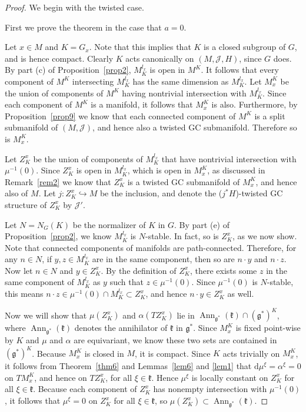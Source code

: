 \documentclass[11pt]{article}
\numberwithin{equation}{section}
\newcommand{\hookfunc}[3]{#1 \colon #2 \hookrightarrow #3}
\newcommand{\tang}{T}
\begin{document}
\begin{proof}
We begin with the twisted case.

First we prove the theorem in the case that $a=0$.

Let $x \in M$ and $K = G_x$.
Note that this implies that $K$ is a closed subgroup of $G$, and is hence compact.
Clearly $K$ acts canonically on $(M,\mathcal{J},H)$, since $G$ does.
By part (c) of Proposition~\ref{prop2}, $M_K^{l_x}$ is open in $M^K$.
It follows that every component of $M^K$ intersecting $M_K^{l_x}$ has the same dimension as $M_K^{l_x}$.
Let $M_x^K$ be the union of components of $M^K$ having nontrivial intersection with $M_K^{l_x}$.
Since each component of $M^K$ is a manifold, it follows that $M_x^K$ is also.
Furthermore, by Proposition~\ref{prop9} we know that each connected component of $M^K$ is a split submanifold of $(M,\mathcal{J})$, and hence also a twisted GC submanifold.
Therefore so is $M_x^K$.

Let $Z_K^x$ be the union of components of $M_K^{l_x}$ that have nontrivial intersection with $\mu^{-1}(0)$.
Since $Z_K^x$ is open in $M_K^{l_x}$, which is open in $M_x^K$, as discussed in Remark~\ref{rem2} we know that $Z_K^x$ is a twisted GC submanifold of $M_x^K$, and hence also of $M$.
Let $\hookfunc{j}{Z_K^x}{M}$ be the inclusion, and denote the ($j^*H$)-twisted GC structure of $Z_K^x$ by $\mathcal{J}'$.

Let $N=N_G(K)$ be the normalizer of $K$ in $G$.  By part (e) of Proposition~\ref{prop2}, we know $M_K^{l_x}$ is $N$-stable.  In fact, so is $Z_K^x$, as we now show.  Note that connected components of manifolds are path-connected.  Therefore, for any $n \in N$, if $y,z \in M_K^{l_x}$ are in the same component, then so are $n \cdot y$ and $n \cdot z$.
Now let $n \in N$ and $y \in Z_K^x$.
By the def\/inition of $Z_K^x$, there exists some $z$ in the same component of $M_K^{l_x}$ as $y$ such that $z \in \mu^{-1}(0)$.
Since $\mu^{-1}(0)$ is $N$-stable, this means $n \cdot z \in \mu^{-1}(0) \cap M_K^{l_x} \subset Z_K^x$, and hence $n \cdot y \in Z_K^x$ as well.

Now we will show that $\mu(Z_K^x)$ and $\alpha( \tang Z_K^x)$ lie in $\operatorname{Ann}_{\mathfrak{g}^*} (\mathfrak{k}) \cap (\mathfrak{g}^*)^K$, where $\operatorname{Ann}_{\mathfrak{g}^*} (\mathfrak{k})$ denotes the annihilator of $\mathfrak{k}$ in $\mathfrak{g}^*$.
Since $M_x^K$ is f\/ixed point-wise by $K$ and $\mu$ and $\alpha$ are equivariant, we know these two sets are contained in $(\mathfrak{g}^*)^K$.
Because $M_x^K$ is closed in $M$, it is compact.  Since $K$ acts trivially on $M_x^K$, it follows from Theorem~\ref{thm6} and Lemmas~\ref{lem6} and \ref{lem1} that $\mathrm{d} \mu^{\xi} = \alpha^{\xi} = 0$ on $\tang M_x^K$, and hence on $\tang Z_K^x$, for all $\xi \in \mathfrak{k}$.
Hence $\mu^{\xi}$ is locally constant on $Z_K^x$ for all $\xi \in \mathfrak{k}$.
Because each component of $Z_K^x$ has nonempty intersection with $\mu^{-1}(0)$, it follows that $\mu^{\xi} = 0$ on $Z_K^x$ for all $\xi \in \mathfrak{k}$, so $\mu(Z_K^x) \subset \operatorname{Ann}_{\mathfrak{g}^*} (\mathfrak{k})$.


\end{proof}
\end{document}
